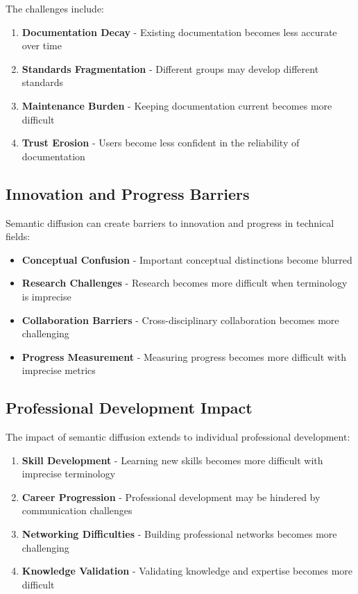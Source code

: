 \documentclass[11pt]{article}
\begin{document}
The challenges include:

\begin{enumerate}
\item \textbf{Documentation Decay} - Existing documentation becomes less accurate over time
\item \textbf{Standards Fragmentation} - Different groups may develop different standards
\item \textbf{Maintenance Burden} - Keeping documentation current becomes more difficult
\item \textbf{Trust Erosion} - Users become less confident in the reliability of documentation
\end{enumerate}

\subsection{Innovation and Progress Barriers}

Semantic diffusion can create barriers to innovation and progress in technical fields:

\begin{itemize}
\item \textbf{Conceptual Confusion} - Important conceptual distinctions become blurred
\item \textbf{Research Challenges} - Research becomes more difficult when terminology is imprecise
\item \textbf{Collaboration Barriers} - Cross-disciplinary collaboration becomes more challenging
\item \textbf{Progress Measurement} - Measuring progress becomes more difficult with imprecise metrics
\end{itemize}

\subsection{Professional Development Impact}

The impact of semantic diffusion extends to individual professional development:

\begin{enumerate}
\item \textbf{Skill Development} - Learning new skills becomes more difficult with imprecise terminology
\item \textbf{Career Progression} - Professional development may be hindered by communication challenges
\item \textbf{Networking Difficulties} - Building professional networks becomes more challenging
\item \textbf{Knowledge Validation} - Validating knowledge and expertise becomes more difficult
\end{enumerate}
\end{document}
